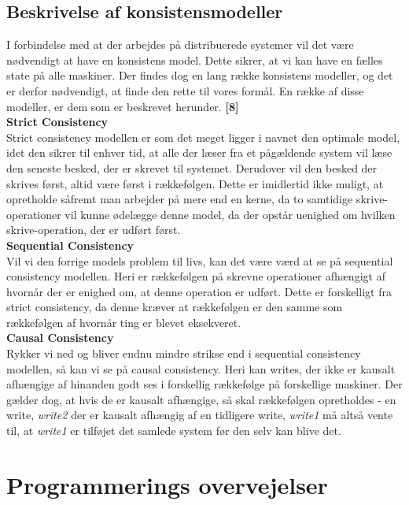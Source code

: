 \documentclass[a4paper,12pt]{article}
\begin{document}
\subsection{Beskrivelse af konsistensmodeller}
I forbindelse med at der arbejdes på distribuerede systemer vil det være nødvendigt at have en konsistens model. Dette sikrer, at vi kan have en fælles state på alle maskiner. 
Der findes dog en lang række konsistens modeller, og det er derfor nødvendigt, at finde den rette til vores formål. En række af disse modeller, er dem som er beskrevet herunder. \textbf{[8]}
\\[5px]
\textbf{Strict Consistency}
\\
Strict consistency modellen er som det meget ligger i navnet den optimale model, idet den sikrer til enhver tid, at alle der læser fra et pågældende system vil læse den seneste besked, der er skrevet til systemet. Derudover vil den besked der skrives først, altid være først i rækkefølgen. Dette er imidlertid ikke muligt, at opretholde såfremt man arbejder på mere end en kerne, da to samtidige skrive-operationer vil kunne ødelægge denne model, da der opstår uenighed om hvilken skrive-operation, der er udført først.
\\[5px]
\textbf{Sequential Consistency}
\\
Vil vi den forrige models problem til livs, kan det være værd at se på sequential consistency modellen. Heri er rækkefølgen på skrevne operationer afhængigt af hvornår der er enighed om, at denne operation er udført. Dette er forskelligt fra strict consistency, da denne kræver at rækkefølgen er den samme som rækkefølgen af hvornår ting er blevet eksekveret.
\\[5px]
\textbf{Causal Consistency}
\\
Rykker vi ned og bliver endnu mindre strikse end i sequential consistency modellen, så kan vi se på causal consistency. Heri kan writes, der ikke er kausalt afhængige af hinanden godt ses i forskellig rækkefølge på forskellige maskiner. Der gælder dog, at hvis de er kausalt afhængige, så skal rækkefølgen opretholdes - en write, \textit{write2} der er kausalt afhængig af en tidligere write, \textit{write1} må altså vente til, at \textit{write1} er tilføjet det samlede system før den selv kan blive det.
\newpage

\section{Programmerings overvejelser}
\end{document}
